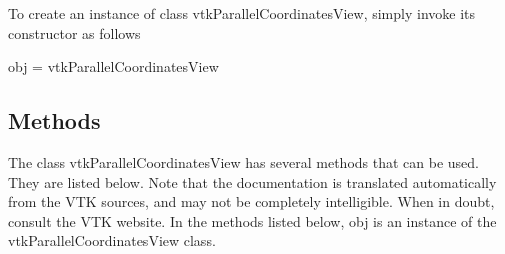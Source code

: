 To create an instance of class vtk\-Parallel\-Coordinates\-View, simply invoke its constructor as follows \begin{DoxyVerb}  obj = vtkParallelCoordinatesView
\end{DoxyVerb}
 \hypertarget{vtkwidgets_vtkxyplotwidget_Methods}{}\subsection{Methods}\label{vtkwidgets_vtkxyplotwidget_Methods}
The class vtk\-Parallel\-Coordinates\-View has several methods that can be used. They are listed below. Note that the documentation is translated automatically from the V\-T\-K sources, and may not be completely intelligible. When in doubt, consult the V\-T\-K website. In the methods listed below, {\ttfamily obj} is an instance of the vtk\-Parallel\-Coordinates\-View class. 
